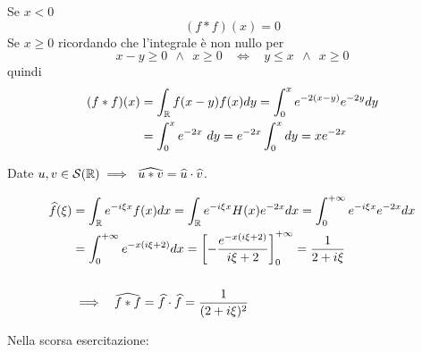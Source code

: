 Se $x < 0$
\begin{equation*}
(f*f)(x) = 0
\end{equation*}
Se $x \geq 0$ ricordando che l'integrale è non nullo per
\begin{equation*}
x - y \geq 0\ \ \land \ \ x \geq 0\ \ \ \ \iff \ \ \ \ y \leq x\ \ \land \ \ x \geq 0
\end{equation*}
quindi
\begin{align*}
(f*f)(x) & = \int_{\mathbb{R}} f(x - y) f(x) dy = \int^{x}_{0} e^{- 2(x - y)} e^{- 2y} dy\\
 & = \int^{x}_{0} e^{- 2x} \ dy = e^{- 2x}\int^{x}_{0} dy = xe^{- 2x}
\end{align*}
\begin{thm}
Date $\displaystyle u, v\in \mathcal{S} (\mathbb{R}) \implies \ \widehat{u*v} = \widehat{u} \cdot \widehat{v}$.
\end{thm}
\begin{align*}
\widehat{f}(\xi) & = \int_{\mathbb{R}} e^{- i\xi x} f(x) dx = \int_{\mathbb{R}} e^{- i\xi x} H(x) e^{- 2x} dx = \int^{+ \infty}_{0} e^{- i\xi x} e^{- 2x} dx\\
 & = \int^{+ \infty}_{0} e^{- x(i\xi + 2)} dx = \left[ - \frac{e^{- x(i\xi + 2)}}{i\xi + 2}\right]^{+ \infty}_{0} = \frac{1}{2 + i\xi}\\
 & \\
 & \implies \ \ \widehat{f*f} = \widehat{f} \cdot \widehat{f} = \frac{1}{(2 + i\xi)^{2}}
\end{align*}
\Soluzione

Nella scorsa esercitazione:

